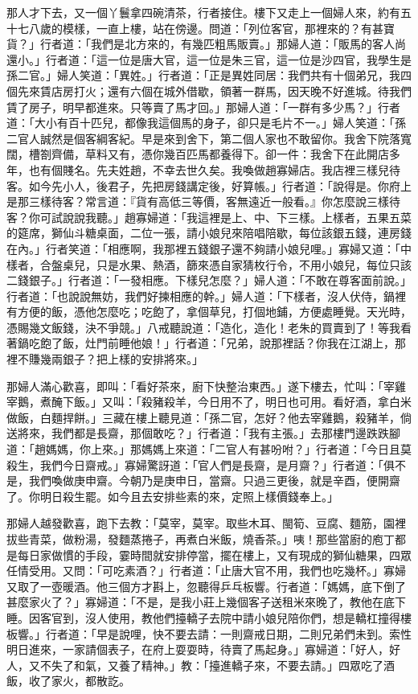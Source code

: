 那人才下去，又一個丫鬟拿四碗清茶，行者接住。樓下又走上一個婦人來，約有五十七八歲的模樣，一直上樓，站在傍邊。問道：「列位客官，那裡來的？有甚寶貨？」行者道：「我們是北方來的，有幾匹粗馬販賣。」那婦人道：「販馬的客人尚還小。」行者道：「這一位是唐大官，這一位是朱三官，這一位是沙四官，我學生是孫二官。」婦人笑道：「異姓。」行者道：「正是異姓同居：我們共有十個弟兄，我四個先來賃店房打火；還有六個在城外借歇，領著一群馬，因天晚不好進城。待我們賃了房子，明早都進來。只等賣了馬才回。」那婦人道：「一群有多少馬？」行者道：「大小有百十匹兒，都像我這個馬的身子，卻只是毛片不一。」婦人笑道：「孫二官人誠然是個客綱客紀。早是來到舍下，第二個人家也不敢留你。我舍下院落寬闊，槽劄齊備，草料又有，憑你幾百匹馬都養得下。卻一件：我舍下在此開店多年，也有個賤名。先夫姓趙，不幸去世久矣。我喚做趙寡婦店。我店裡三樣兒待客。如今先小人，後君子，先把房錢講定後，好算帳。」行者道：「說得是。你府上是那三樣待客？常言道：『貨有高低三等價，客無遠近一般看。』你怎麼說三樣待客？你可試說說我聽。」趙寡婦道：「我這裡是上、中、下三樣。上樣者，五果五菜的筵席，獅仙斗糖桌面，二位一張，請小娘兒來陪唱陪歇，每位該銀五錢，連房錢在內。」行者笑道：「相應啊，我那裡五錢銀子還不夠請小娘兒哩。」寡婦又道：「中樣者，合盤桌兒，只是水果、熱酒，篩來憑自家猜枚行令，不用小娘兒，每位只該二錢銀子。」行者道：「一發相應。下樣兒怎麼？」婦人道：「不敢在尊客面前說。」行者道：「也說說無妨，我們好揀相應的幹。」婦人道：「下樣者，沒人伏侍，鍋裡有方便的飯，憑他怎麼吃；吃飽了，拿個草兒，打個地鋪，方便處睡覺。天光時，憑賜幾文飯錢，決不爭競。」八戒聽說道：「造化，造化！老朱的買賣到了！等我看著鍋吃飽了飯，灶門前睡他娘！」行者道：「兄弟，說那裡話？你我在江湖上，那裡不賺幾兩銀子？把上樣的安排將來。」

那婦人滿心歡喜，即叫：「看好茶來，廚下快整治東西。」遂下樓去，忙叫：「宰雞宰鵝，煮醃下飯。」又叫：「殺豬殺羊，今日用不了，明日也可用。看好酒，拿白米做飯，白麵捍餅。」三藏在樓上聽見道：「孫二官，怎好？他去宰雞鵝，殺豬羊，倘送將來，我們都是長齋，那個敢吃？」行者道：「我有主張。」去那樓門邊跌跌腳道：「趙媽媽，你上來。」那媽媽上來道：「二官人有甚吩咐？」行者道：「今日且莫殺生，我們今日齋戒。」寡婦驚訝道：「官人們是長齋，是月齋？」行者道：「俱不是，我們喚做庚申齋。今朝乃是庚申日，當齋。只過三更後，就是辛酉，便開齋了。你明日殺生罷。如今且去安排些素的來，定照上樣價錢奉上。」

那婦人越發歡喜，跑下去教：「莫宰，莫宰。取些木耳、閩筍、豆腐、麵筋，園裡拔些青菜，做粉湯，發麵蒸捲子，再煮白米飯，燒香茶。」咦！那些當廚的庖丁都是每日家做慣的手段，霎時間就安排停當，擺在樓上，又有現成的獅仙糖果，四眾任情受用。又問：「可吃素酒？」行者道：「止唐大官不用，我們也吃幾杯。」寡婦又取了一壺暖酒。他三個方才斟上，忽聽得乒乓板響。行者道：「媽媽，底下倒了甚麼家火了？」寡婦道：「不是，是我小莊上幾個客子送租米來晚了，教他在底下睡。因客官到，沒人使用，教他們擡轎子去院中請小娘兒陪你們，想是轎杠撞得樓板響。」行者道：「早是說哩，快不要去請：一則齋戒日期，二則兄弟們未到。索性明日進來，一家請個表子，在府上耍耍時，待賣了馬起身。」寡婦道：「好人，好人，又不失了和氣，又養了精神。」教：「擡進轎子來，不要去請。」四眾吃了酒飯，收了家火，都散訖。

